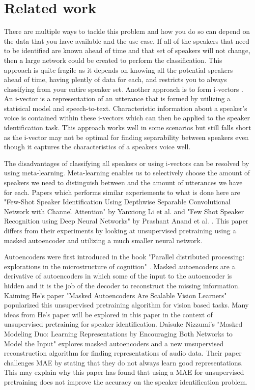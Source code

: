 \documentclass{article}
\begin{document}
\section{Related work}
There are multiple ways to tackle this problem and how you do so can depend on the data that you have available and 
the use case. If all of the speakers that need to be identified are known ahead of time and that set of speakers will 
not change, then a large network could be created to perform the classification. This approach is quite fragile as it 
depends on knowing all the potential speakers ahead of time, having plently of data for each, and restricts you to 
always classifying from your entire speaker set. Another approach is to form i-vectors \cite{ivectors}. An i-vector
is a representation of an utterance that is formed by utilizing a statisical model and speech-to-text. Characteristic 
information about a speaker's voice is contained within these i-vectors which can then be applied to the speaker 
identification task. This approach works well in some scenarios but still falls short as the i-vector may not be optimal
for finding separability between speakers even though it captures the characteristics of a speakers voice well.

The disadvantages of classifying all speakers or using i-vectors can be resolved by using meta-learning. Meta-learning
enables us to selectively choose the amount of speakers we need to distinguish between and the amount of utterances we have
for each. Papers which performs similar experiements to what is done here are "Few-Shot Speaker Identification Using Depthwise
Separable Convolutional Network with Channel Attention" \cite{FewShotSpeakerIDChannelAttention} by Yanxiong Li et al. and
"Few Shot Speaker Recognition using Deep Neural Networks" by Prashant Anand et al. \cite{FewShotSpeakerRecognition}. This paper
differs from their experiments by looking at unsupervised pretraining using a masked autoencoder and utilizing a much smaller
neural network.

Autoencoders were first introduced in the book "Parallel distributed processing: explorations in the microstructure of 
cognition" \cite{ParallelDistributedProcessing}. Masked autoencoders are a derivative of autoencoders in which some of the
input to the autoencoder is hidden and it is the job of the decoder to reconstruct the missing information. Kaiming He's paper
"Masked Autoencoders Are Scalable Vision Learners" \cite{MAE} popularized this unsupervised pretraining algorithm for vision based tasks.
Many ideas from He's paper will be explored in this paper in the context of unsupervised pretraining for speaker identification.
Daisuke Nizzumi's "Masked Modeling Duo: Learning Representations by Encouraging Both Networks to Model 
the Input" \cite{MaskedModelingDuo} explores masked autoencoders and a new unsupervised reconstruction algorithm for finding representations 
of audio data. Their paper challenges MAE by stating that they do not always learn good representations. This may explain 
why this paper has found that using a MAE for unsupervised pretraining does not improve the accuracy on the speaker identification problem.
\end{document}
